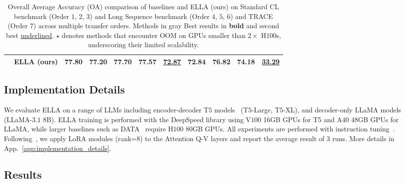 \documentclass[11pt]{article}
\newcommand{\bluerow}[1]{\textcolor{blue!55}{#1}}
\begin{document}
\begin{table}[!ht]
{\begin{tabular}{clccccccccc}
& \bluerow{\textbf{ELLA (ours)}} 
& \bluerow{\textbf{77.80}} & \bluerow{\textbf{77.20}} & \bluerow{\textbf{77.70}} & \bluerow{\textbf{77.57}} 
& \bluerow{\underline{72.87}} & \bluerow{72.84} & \bluerow{\textbf{76.82}} & \bluerow{\textbf{74.18}} & \bluerow{\underline{33.29}} \\
\bottomrule
\end{tabular}
}
\vspace{-8pt}
\caption{Overall Average Accuracy (OA) comparison of baselines and ELLA (ours) on Standard CL benchmark (Order $1$, $2$, $3$) and Long Sequence benchmark (Order $4$, $5$, $6$) and TRACE (Order $7$) across multiple transfer orders. Methods in \textcolor[gray]{0.55}{gray} \color{black}{rely on replay mechanisms to boost performance.} Best results in \textbf{bold} and second best \underline{underlined}. $\star$ denotes methods that encounter OOM on GPUs smaller than $2 \times$ H$100$s, underscoring their limited scalability.}
\label{tab:results}
\vspace{-6pt}
\end{table}
\subsection{Implementation Details}
We evaluate ELLA on a range of LLMs including encoder-decoder T$5$ models~\cite{raffel2020exploring} (T$5$-Large, T$5$-XL), and decoder-only LLaMA
models~\cite{touvron2023llama} (LLaMA-$3.1$ $8$B). ELLA training is performed with the DeepSpeed library using V$100$ 16GB GPUs for T5 and A$40$ 48GB GPUs for LLaMA, while larger baselines such as DATA~\cite{liao2025data} require H$100$ 80GB GPUs. All experiments are
performed with instruction tuning~\cite{wei2021finetuned}. %
Following~\cite{wang2023orthogonal}, we apply LoRA modules (rank=$8$) to the Attention Q-V layers and report the average result of $3$ runs. More details in App.~\ref{app:implementation_details}.

\subsection{Results}
\end{document}
